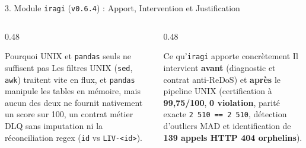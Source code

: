 \documentclass[aspectratio=169,10pt]{beamer}
\begin{document}
\begin{frame}{3. Module \texttt{iragi} (\texttt{v0.6.4}) : Apport, Intervention et Justification}
\begin{center}
    \end{center}
    \vspace{0.1cm}
    \begin{columns}[T]
        \begin{column}{0.48\textwidth}
            \begin{alertblock}{Pourquoi UNIX et \texttt{pandas} seuls ne suffisent pas}
                \scriptsize\justifying
                Les filtres UNIX (\texttt{sed}, \texttt{awk}) traitent vite en flux, et \texttt{pandas} manipule les tables en m\'emoire, mais aucun des deux ne fournit nativement un score sur 100, un contrat m\'etier DLQ sans imputation ni la r\'econciliation regex (\texttt{id} vs \texttt{LIV-<id>}).
            \end{alertblock}
        \end{column}
        \begin{column}{0.48\textwidth}
            \begin{exampleblock}{Ce qu'\texttt{iragi} apporte concr\`etement}
                \scriptsize\justifying
                Il intervient \textbf{avant} (diagnostic et contrat anti-ReDoS) et \textbf{apr\`es} le pipeline UNIX (certification \`a \textbf{99,75/100}, \textbf{0 violation}, parit\'e exacte \texttt{2\,510 == 2\,510}, d\'etection d'outliers MAD et identification de \textbf{139 appels HTTP 404 orphelins}).
            \end{exampleblock}
        \end{column}
    \end{columns}
\end{frame}
\end{document}
